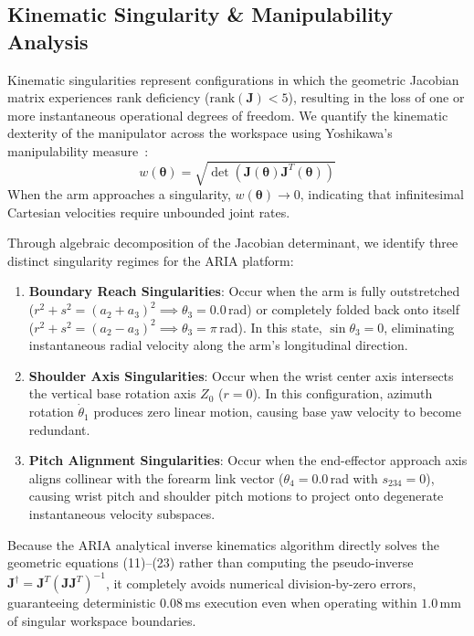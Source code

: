\documentclass[journal]{IEEEtran}
\begin{document}
\subsection{Kinematic Singularity \& Manipulability Analysis}
Kinematic singularities represent configurations in which the geometric Jacobian matrix experiences rank deficiency ($\text{rank}(\mathbf{J}) < 5$), resulting in the loss of one or more instantaneous operational degrees of freedom. We quantify the kinematic dexterity of the manipulator across the workspace using Yoshikawa's manipulability measure~\cite{yoshikawa1985manipulability}:
\begin{equation}
w(\boldsymbol{\theta}) = \sqrt{\det\left( \mathbf{J}(\boldsymbol{\theta}) \mathbf{J}^T(\boldsymbol{\theta}) \right)}
\end{equation}
When the arm approaches a singularity, $w(\boldsymbol{\theta}) \to 0$, indicating that infinitesimal Cartesian velocities require unbounded joint rates.

Through algebraic decomposition of the Jacobian determinant, we identify three distinct singularity regimes for the ARIA platform:
\begin{enumerate}
    \item \textbf{Boundary Reach Singularities}: Occur when the arm is fully outstretched ($r^2 + s^2 = (a_2 + a_3)^2 \implies \theta_3 = 0.0$\,rad) or completely folded back onto itself ($r^2 + s^2 = (a_2 - a_3)^2 \implies \theta_3 = \pi$\,rad). In this state, $\sin\theta_3 = 0$, eliminating instantaneous radial velocity along the arm's longitudinal direction.
    \item \textbf{Shoulder Axis Singularities}: Occur when the wrist center axis intersects the vertical base rotation axis $Z_0$ ($r = 0$). In this configuration, azimuth rotation $\dot{\theta}_1$ produces zero linear motion, causing base yaw velocity to become redundant.
    \item \textbf{Pitch Alignment Singularities}: Occur when the end-effector approach axis aligns collinear with the forearm link vector ($\theta_4 = 0.0$\,rad with $s_{234} = 0$), causing wrist pitch and shoulder pitch motions to project onto degenerate instantaneous velocity subspaces.
\end{enumerate}

Because the ARIA analytical inverse kinematics algorithm directly solves the geometric equations (11)–(23) rather than computing the pseudo-inverse $\mathbf{J}^\dagger = \mathbf{J}^T (\mathbf{J}\mathbf{J}^T)^{-1}$, it completely avoids numerical division-by-zero errors, guaranteeing deterministic $0.08$\,ms execution even when operating within $1.0$\,mm of singular workspace boundaries.
\end{document}
